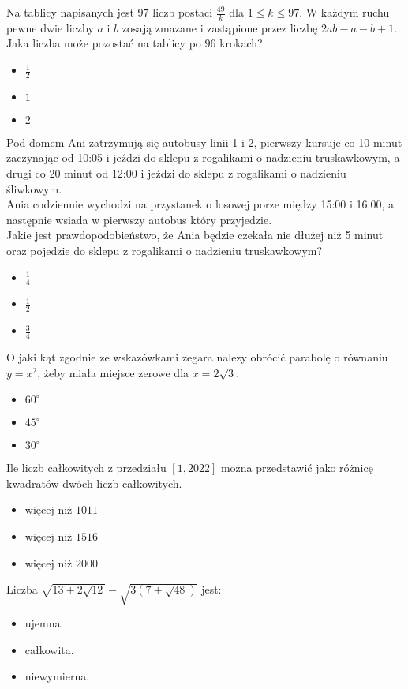 \documentclass[12pt, a4paper]{article}
\newcommand{\question}[1]{\normalitem \begin{samepage}#1 \end{samepage}}
\newcommand{\questionwithasterix}[1]{ \asterixitem \begin{samepage}#1 \vspace{6cm}\end{samepage}}
\begin{document}
\begin{enumerate}
	\question {
		Na tablicy napisanych jest $97$ liczb postaci $\frac{49}{k}$ dla $1 \leq k \leq 97$. W każdym ruchu pewne dwie liczby $a$ i $b$ zosają zmazane i zastąpione przez liczbę $2ab-a-b+1$. Jaka liczba może pozostać na tablicy po $96$ krokach?
		
		\begin{itemize}
			\item $\frac{1}{2}$
			\item $1$
			\item $2$
		\end{itemize}
	}
	
	\question {
		Pod domem Ani zatrzymują się autobusy linii 1 i 2, pierwszy kursuje co 10 minut zaczynając od 10:05 i jeździ do sklepu z rogalikami o nadzieniu truskawkowym, a drugi co 20 minut od 12:00 i jeździ do sklepu z rogalikami o nadzieniu śliwkowym. \\
		Ania codziennie wychodzi na przystanek o losowej porze między 15:00 i 16:00, a następnie wsiada w pierwszy autobus który przyjedzie. \\
		Jakie jest prawdopodobieństwo, że Ania będzie czekała nie dłużej niż 5 minut oraz pojedzie do sklepu z rogalikami o nadzieniu truskawkowym?
		
		\begin{itemize}
			\item $\frac{1}{4}$
			\item $\frac{1}{2}$
			\item $\frac{3}{4}$
		\end{itemize}
	}
	
	\question {
		O jaki kąt zgodnie ze wskazówkami zegara nalezy obrócić parabolę o równaniu $y=x^2$, żeby miała miejsce zerowe dla $x=2 \sqrt{3}$.
		
		\begin{itemize}
			\item $60^{\circ}$  
			\item $45^{\circ}$
			\item $30^{\circ}$
		\end{itemize}
	}
	
	\question {
		Ile liczb całkowitych z przedziału $[1,2022]$ można przedstawić jako różnicę kwadratów dwóch liczb całkowitych. 
		
		\begin{itemize}
			\item więcej niż $1011$
			\item więcej niż $1516$
			\item więcej niż $2000$
		\end{itemize}
	}
	
	\questionwithasterix {
		Liczba $\sqrt{13+2 \sqrt{12}}-\sqrt{3(7+\sqrt{48})}$ jest:
		
		\begin{itemize}
			\item ujemna.
			\item całkowita.
			\item niewymierna.
		\end{itemize}
	}
	
\end{enumerate}
\end{document}
